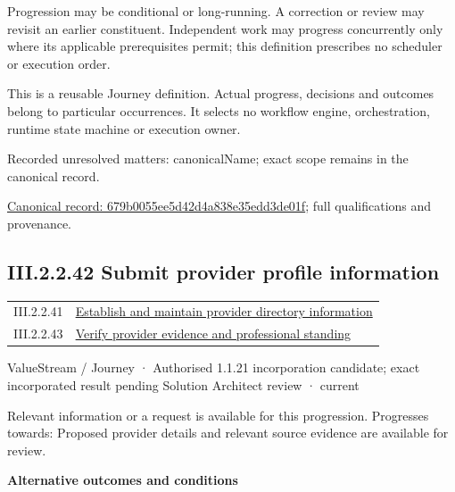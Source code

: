 Progression may be conditional or long-running. A correction or review may revisit an earlier constituent. Independent work may progress concurrently only where its applicable prerequisites permit; this definition prescribes no scheduler or execution order.



This is a reusable Journey definition. Actual progress, decisions and outcomes belong to particular occurrences. It selects no workflow engine, orchestration, runtime state machine or execution owner.


{\small Recorded unresolved matters: canonicalName; exact scope remains in the canonical record.}\par
{\footnotesize \href{../../../../../../../continuum/strategy/value-stream/679b0055ee5d42d4a838e35edd3de01f.md}{Canonical record: 679b0055ee5d42d4a838e35edd3de01f}; full qualifications and provenance.}\par
\subsection*{III.2.2.42 Submit provider profile information}
\label{navigation:III.2.2.42}

\begin{longtable}{p{.22\linewidth}p{.73\linewidth}}
III.2.2.41 & \hyperref[element:679b0055ee5d42d4a838e35edd3de01f]{Establish and maintain provider directory information} \\
III.2.2.43 & \hyperref[element:733f2f6c9a5e49ceb0107d30bc736945]{Verify provider evidence and professional standing} \\
\end{longtable}
\label{element:872c6dd226d048298444d44b3ee00dca}
{\small ValueStream / Journey · Authorised 1.1.21 incorporation candidate; exact incorporated result pending Solution Architect review · current}\par

Relevant information or a request is available for this progression. Progresses towards: Proposed provider details and relevant source evidence are available for review.



\par\medskip\textbf{Alternative outcomes and conditions}\par


